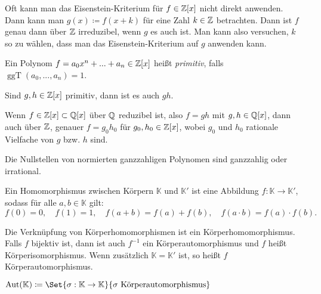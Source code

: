 \documentclass{cheat-sheet}
\newcommand{\K}{\mathbb{K}} %
\DeclareMathOperator{\ggT}{ggT} %
\DeclareMathOperator{\Aut}{Aut} %
\begin{document}
\begin{bem}
  Oft kann man das Eisenstein-Kriterium für $f \in \mathbb{Z}[x]$ nicht direkt anwenden. Dann kann man $g(x) \coloneqq f(x + k)$ für eine Zahl $k \in \mathbb{Z}$ betrachten. Dann ist $f$ genau dann über $\mathbb{Z}$ irreduzibel, wenn $g$ es auch ist. Man kann also versuchen, $k$ so zu wählen, dass man das Eisenstein-Kriterium auf $g$ anwenden kann.
\end{bem}


\begin{defn}
  Ein Polynom $f = a_0 x^n + ... + a_n \in \mathbb{Z}[x]$ heißt \emph{primitiv}, falls $\ggT(a_0, ..., a_n) = 1$.
\end{defn}

\begin{lem}
  Sind $g, h \in \mathbb{Z}[x]$ primitiv, dann ist es auch $gh$.
\end{lem}

\begin{satz}
  Wenn $f \in \mathbb{Z}[x] \subset \mathbb{Q}[x]$ über $\mathbb{Q}$ reduzibel ist, also $f = gh$ mit $g, h \in \mathbb{Q}[x]$, dann auch über $\mathbb{Z}$, genauer $f = g_0 h_0$ für $g_0, h_0 \in \mathbb{Z}[x]$, wobei $g_0$ und $h_0$ rationale Vielfache von $g$ bzw. $h$ sind.
\end{satz}

\begin{kor}
  Die Nullstellen von normierten ganzzahligen Polynomen sind ganzzahlig oder irrational.
\end{kor}


\begin{defn}
  Ein Homomorphismus zwischen Körpern $\K$ und $\K'$ ist eine Abbildung $f : \K \to \K'$, sodass für alle $a, b \in \K$ gilt:
  \[
    f(0) = 0, \quad f(1) = 1, \quad f(a + b) = f(a) + f(b), \quad f(a \cdot b) = f(a) \cdot f(b).
  \]
\end{defn}

\begin{bem}
  Die Verknüpfung von Körperhomomorphismen ist ein Körperhomomorphismus. Falls $f$ bijektiv ist, dann ist auch $f^{-1}$ ein Körperautomorphismus und $f$ heißt Körperisomorphismus.  Wenn zusätzlich $\K = \K'$ ist, so heißt $f$ Körperautomorphismus.
\end{bem}

\begin{nota}
  $\Aut(\K) \coloneqq \Set{ \sigma : \K \to \K }{ \sigma \text{ Körperautomorphismus} }$
\end{nota}
\end{document}
